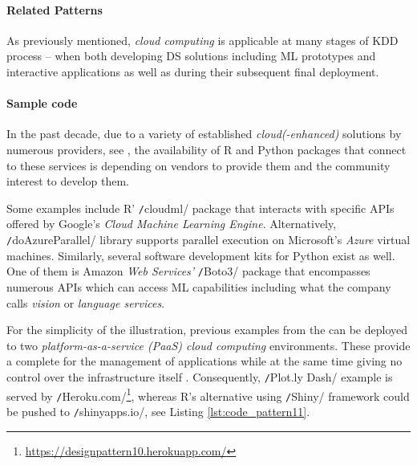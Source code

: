 \paragraph*{Related Patterns}
As previously mentioned, \emph{cloud computing} is applicable at many stages of \ac{KDD} process -- when both developing \ac{DS} solutions including \ac{ML} prototypes and interactive applications as well as during their subsequent final deployment.

\paragraph*{Sample code}
In the past decade, due to a variety of established \emph{cloud(-enhanced)} solutions by numerous providers, see \textcites{Durao2014AComputing}{Zhang2010CloudChallenges}, the availability of R and Python packages that connect to these services is depending on vendors to provide them and the community interest to develop them. 

Some examples include R' \texttt/cloudml/ package that interacts with specific \acp{API} offered by Google's \emph{Cloud Machine Learning Engine}.  
Alternatively, \texttt/doAzureParallel/ library supports parallel execution on Microsoft's \emph{Azure} virtual machines.
Similarly, several software development kits for Python exist as well. 
One of them is Amazon \emph{Web Services'} \texttt/Boto3/ package that encompasses numerous \acp{API} which can access \ac{ML} capabilities including what the company calls \emph{vision} or \emph{language services}.

For the simplicity of the illustration, previous examples from the  can be deployed to two \emph{platform-as-a-service (PaaS) cloud computing} environments.
These provide a complete  for the management of applications while at the same time giving no control over the infrastructure itself \parencites[10]{Zhang2010CloudChallenges}{Pahl2015ContainerizationCloud}. 
Consequently, \texttt/Plot.ly Dash/ example is served by \texttt/Heroku.com/\footnote{\href{https://designpattern10.herokuapp.com/}{https://designpattern10.herokuapp.com/}}, whereas R's alternative using \texttt/Shiny/ framework could be pushed to \texttt/shinyapps.io/, see Listing \ref{lst:code_pattern11}. 

